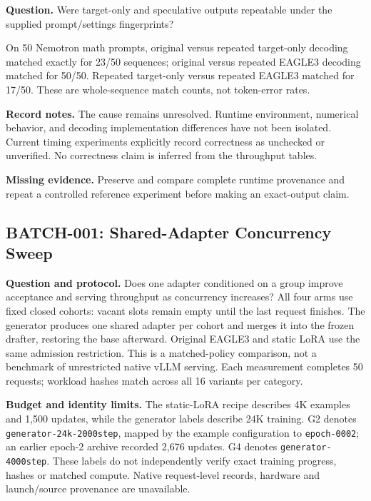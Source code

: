 \textbf{Question.} Were target-only and speculative outputs repeatable under
the supplied prompt/settings fingerprints?

On 50 Nemotron math prompts, original versus repeated target-only decoding
matched exactly for 23/50 sequences; original versus repeated EAGLE3 decoding
matched for 50/50. Repeated target-only versus repeated EAGLE3 matched for
17/50. These are whole-sequence match counts, not token-error rates.

\textbf{Record notes.} The cause remains unresolved. Runtime environment,
numerical behavior, and decoding implementation differences have not been
isolated. Current timing experiments explicitly record correctness as unchecked
or unverified. No correctness claim is inferred from the throughput tables.

\textbf{Missing evidence.} Preserve and compare complete runtime provenance and
repeat a controlled reference experiment before making an exact-output claim.

\subsection{BATCH-001: Shared-Adapter Concurrency Sweep}

\textbf{Question and protocol.} Does one adapter conditioned on a group improve
acceptance and serving throughput as concurrency increases? All four arms use
fixed closed cohorts: vacant slots remain empty until the last request finishes.
The generator produces one shared adapter per cohort and merges it into the
frozen drafter, restoring the base afterward. Original EAGLE3 and static LoRA
use the same admission restriction. This is a matched-policy comparison, not a
benchmark of unrestricted native vLLM serving. Each measurement completes 50
requests; workload hashes match across all 16 variants per category.

\textbf{Budget and identity limits.} The static-LoRA recipe describes 4K examples
and 1,500 updates, while the generator labels describe 24K training. G2 denotes
\texttt{generator-24k-2000step}, mapped by the example configuration to
\texttt{epoch-0002}; an earlier epoch-2 archive recorded 2,676 updates. G4 denotes
\texttt{generator-4000step}. These labels do not independently verify exact
training progress, hashes or matched compute. Native request-level records,
hardware and launch/source provenance are unavailable.

